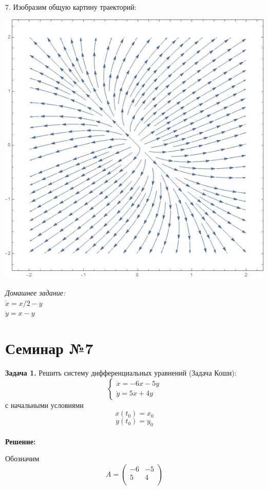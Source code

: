 \documentclass[10pt]{report}
\begin{document}
7. Изобразим общую картину траекторий:
\begin{center}
{\includegraphics[scale=0.5]{graph7.1.jpg}} 
\end{center}

\textit{Домашнее задание:\\
$\dot{x}=x/2-y$\\
$\dot{y}=x-y$}

\chapter[{Семинар №7}]{Семинар №7}
\thispagestyle{empty}
\textbf{Задача 1.} Решить систему дифференциальных уравнений (Задача Коши): 
\begin{equation}
\left\{
\begin{array}{lr}
\dot{x} = -6x-5y\\
\dot{y} = 5x+4y
\end{array}
\right.
\end{equation}
с начальными условиями
\[ x(t_0)=x_0\]
\[y(t_0)=y_0\]\\
\textbf{Решение:} \par
Обозначим 
\[
A = \left(
\begin{array}{cc}
-6 & -5\\
5 & 4\\
\end{array}
\right)\]
\end{document}
